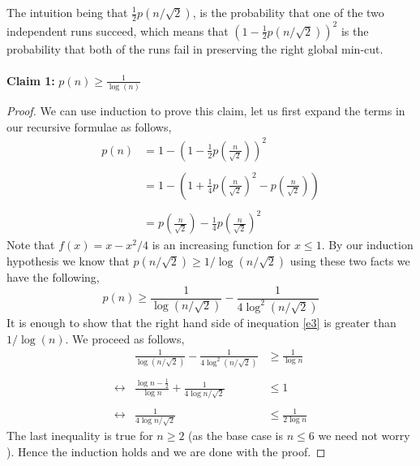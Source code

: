 \documentclass{article}
\numberwithin{equation}{section}
\newcommand{\roundBrace}[1]{\left(#1\right)}
\begin{document}
\noindent The intuition being that $\frac{1}{2}p(n/\sqrt{2})$, is the probability that one of the two independent runs succeed, which means that $\roundBrace{1 - \frac{1}{2}p(n/\sqrt{2})}^2$ is the probability that both of the runs fail in preserving the right global min-cut. \\\\
\textbf{Claim 1:} $p(n) \ge \frac{1}{\log(n)}$
\begin{proof}
    We can use induction to prove this claim, let us first expand the terms in our recursive formulae as follows, 
    \begin{equation}
        \begin{split}
            p(n) &= 1 - \roundBrace{1 - \frac{1}{2}p\roundBrace{\frac{n}{\sqrt{2}}}}^2\\\\
            &= 1 - \roundBrace{1+\frac{1}{4}p\roundBrace{\frac{n}{\sqrt{2}}}^2 - p\roundBrace{\frac{n}{\sqrt{2}}}}\\\\
            &= p\roundBrace{\frac{n}{\sqrt{2}}} - \frac{1}{4}p \roundBrace{\frac{n}{\sqrt{2}}}^2
        \end{split}
    \end{equation}
Note that $f(x) = x - x^2/4$  is an increasing function for $x \le 1$. By our induction hypothesis we know that $p(n/\sqrt{2}) \ge  1/\log{(n/\sqrt{2})}$ using these two facts we have the following, 
\begin{equation}
\label{e3}
    p(n) \ge \frac{1}{\log(n/\sqrt{2})} - \frac{1}{4\log^2(n/\sqrt{2})}
\end{equation}
It is enough to show that the right hand side of inequation \ref{e3} is greater than $1/\log(n)$. We proceed as follows, 
\begin{equation}
\begin{array}{ccc}
     &\frac{1}{\log(n/\sqrt{2})} - \frac{1}{4\log^2(n/\sqrt{2})} &\ge \frac{1}{\log{n}}  \\\\
     \leftrightarrow& \frac{\log{n} - \frac{1}{2}}{\log{n}} + \frac{1}{4 \log{n/\sqrt{2}}} &\le 1\\\\
\leftrightarrow& \frac{1}{4 \log{n/\sqrt{2}}}& \le \frac{1}{2\log{n}}
\end{array}
\end{equation}
The last inequality is true for $n\ge 2$ (as the base case is $n\le 6$ we need not worry ). Hence the induction holds and we are done with the proof. 

    
\end{proof}
\end{document}

